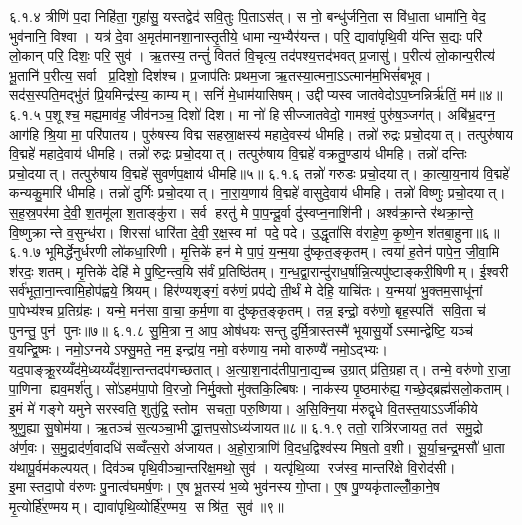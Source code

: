 ६.१.४
त्रीणि॑ प॒दा निहि॑ता॒ गुहा॑सु॒ यस्तद्वेद॑ सवि॒तुः पि॒ताऽस॑त्। स नो॒ बन्धु॑र्जनि॒ता स वि॑धा॒ता धामा॑नि॒ वेद॒ भुव॑नानि॒ विश्वा। यत्र॑ दे॒वा अ॒मृत॑मानशा॒नास्तृ॒तीये॒ धामान्य॒भ्यैर॑यन्त। परि॒ द्यावा॑पृथि॒वी य॑न्ति स॒द्यः परि॑ लो॒कान् परि॒ दिशः॒ परि॒ सुव॑। ऋ॒तस्य॒ तन्तुं॑  विततं  वि॒चृत्य॒ तद॑पश्य॒त्तद॑भवत् प्र॒जासु॑। प॒रीत्य॑ लो॒कान्प॒रीत्य॑ भू॒तानि॑ प॒रीत्य॒ सर्वा प्र॒दिशो॒ दिश॑श्च। प्र॒जाप॑तिः प्रथम॒जा ऋ॒तस्या॒त्मना॒ऽऽत्मान॑म॒भिसं॑बभूव। सद॑स॒स्पति॒मद्भु॑तं प्रि॒यमिन्द्र॑स्य॒ काम्यम्। सनिं॑ मे॒धाम॑यासिषम्। उद्दीप्यस्व जातवेदोऽप॒घ्नन्निर्\mbox{}ऋ॑तिं॒ मम॑॥४॥
६.१.५
प॒शूश्च॒ मह्य॒माव॑ह॒ जीव॑नञ्च॒ दिशो॑ दिश। मा नो॑ हिसीज्जातवेदो॒ गामश्वं॒ पुरु॑ष॒ञ्जग॑त्। अबि॑भ्र॒दग्न॒ आग॑हि श्रि॒या मा॒ परि॑पातय। पुरु॑षस्य विद्म सहस्रा॒क्षस्य॑ महादे॒वस्य॑ धीमहि। तन्नो॑ रुद्रः प्रचो॒दयात्। तत्पुरु॑षाय वि॒द्महे॑ महादे॒वाय॑ धीमहि। तन्नो॑ रुद्रः प्रचो॒दयात्। तत्पुरु॑षाय वि॒द्महे॑ वक्रतु॒ण्डाय॑ धीमहि। तन्नो॑ दन्तिः प्रचो॒दयात्। तत्पुरु॑षाय वि॒द्महे॑ सुवर्णप॒क्षाय॑ धीमहि॥५॥
६.१.६
तन्नो॑ गरुडः प्रचो॒दयात्। का॒त्या॒य॒नाय॑ वि॒द्महे॑ कन्यकु॒मारि॑ धीमहि। तन्नो॑ दुर्गिः प्रचो॒दयात्। ना॒रा॒य॒णाय॑ वि॒द्महे॑ वासुदे॒वाय॑ धीमहि। तन्नो॑ विष्णुः प्रचो॒दयात्। स॒ह॒स्र॒पर॑मा दे॒वी॒ श॒तमू॑ला श॒ताङ्कु॑रा। सर्व हरतु॑ मे पा॒प॒न्दू॒र्वा दु॑स्वप्न॒नाशि॑नी। अश्व॑क्रा॒न्ते र॑थक्रा॒न्ते॒ वि॒ष्णुक्रान्ते व॒सुन्ध॑रा। शिरसा॑ धारि॑ता दे॒वी॒ र॒क्ष॒स्व मां पदे॒ पदे। उ॒द्धृता॑सि व॑राहे॒ण॒ कृ॒ष्णे॒न श॑तबा॒हुना॥६॥
६.१.७
भूमिर्द्धेनुर्धरणी लो॑कधा॒रिणी। मृ॒त्तिके॑ हन॑ मे पा॒पं॒ य॒न्म॒या दु॑ष्कृत॒ङ्कृतम्। त्वया॑ ह॒तेन॑ पापे॒न॒ जी॒वा॒मि श॑रदः॒ शतम्। मृ॒त्तिके॑ देहि॑ मे पु॒ष्टि॒न्त्व॒यि स॑र्वं प्र॒तिष्ठि॑तम्। ग॒न्ध॒द्वा॒रान्दु॑राध॒र्\mbox{}षान्नि॒त्यपु॑ष्टाङ्करी॒षिणीम्। ई॒श्वरी सर्व॑भूता॒ना॒न्त्वामि॒होप॑ह्वये॒ श्रियम्। हिर॑ण्यशृङ्गं॒ वरु॑णं॒ प्रप॑द्ये ती॒र्थं मे देहि॒ याचि॑तः। य॒न्मया॑ भु॒क्तम॒साधू॑नां पा॒पेभ्य॑श्च प्र॒तिग्र॑हः। यन्मे॒ मन॑सा वा॒चा॒ क॒र्म॒णा वा दु॑ष्कृत॒ङ्कृतम्। तन्न॒ इन्द्रो॒ वरु॑णो॒ बृह॒स्पति॑ सवि॒ता च॑ पुनन्तु॒ पुन॑ पुनः॥७॥
६.१.८
सु॒मि॒त्रा न॒ आप॒ ओष॑धयः सन्तु दुर्मि॒त्रास्तस्मै॑ भूयासु॒र्योऽस्मान्द्वेष्टि॒ यञ्च॑ व॒यन्द्वि॒ष्मः। नमो॒ऽग्नयेऽफ्सु॒मते॒ नम॒ इन्द्रा॑य॒ नमो॒ वरु॑णाय॒ नमो वारुण्यै॑ नमो॒ऽद्भ्यः। यद॒पाङ्क्रू॒रय्यँद॑मे॒ध्यय्यँद॑शा॒न्तन्तदप॑गच्छतात्। अ॒त्या॒श॒नाद॑तीपा॒ना॒द्य॒च्च उ॒ग्रात् प्र॑ति॒ग्रहात्। तन्मे॒ वरु॑णो रा॒जा॒ पा॒णिना ह्यव॒मर्\mbox{}श॑तु। सो॑ऽहम॑पा॒पो वि॒रजो॒ निर्मु॒क्तो मु॑क्तकि॒ल्बिषः। नाक॑स्य पृ॒ष्ठमारु॑ह्य॒ गच्छे॒द्ब्रह्म॑सलो॒कताम्। इ॒मं मे॑ गङ्गे यमुने सरस्वति॒ शुतु॑द्रि॒ स्तोम सचता॒ परु॒ष्णिया। अ॒सि॒क्नि॒या म॑रुद्वृधे वि॒तस्त॒याऽऽर्जी॑कीये श्रुणु॒ह्या सु॒षोम॑या। ऋ॒तञ्च॑ स॒त्यञ्चा॒भीद्धा॒त्तप॒सोऽध्य॑जायत॥८॥
६.१.९
ततो॒ रात्रि॑रजायत॒ तत॑ समु॒द्रो अ॑र्ण॒वः। स॒मु॒द्राद॑र्ण॒वादधि॑ सव्वँत्स॒रो अ॑जायत। अ॒हो॒रा॒त्राणि॑ वि॒दध॒द्विश्व॑स्य मिष॒तो व॒शी। सू॒र्या॒च॒न्द्र॒मसौ॑ धा॒ता य॑थापू॒र्वम॑कल्पयत्। दिव॑ञ्च पृथि॒वीञ्चा॒न्तरि॑क्ष॒मथो॒ सुव॑। यत्पृ॑थि॒व्या रज॑स्व॒ मान्तरि॑क्षे वि॒रोद॑सी। इ॒मास्तदा॒पो व॑रुणः पु॒नात्व॑घमर्\mbox{}ष॒णः। ए॒ष भू॒तस्य॑ भ॒व्ये भुव॑नस्य गो॒प्ता। ए॒ष पु॒ण्यकृ॑ताल्लोँ॒का॒ने॒ष मृ॒त्योर्\mbox{}हि॑र॒ण्मयम्। द्यावा॑पृथि॒व्योर्\mbox{}हि॑र॒ण्मय॒ सश्रि॑त॒ सुव॑॥९॥
